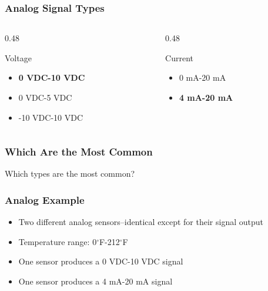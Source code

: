 \begin{frame}
    \frametitle{Analog Signal Types}

    \begin{columns}[t]
        \begin{column}{0.48\linewidth}
            \begin{block}{Voltage}
                \begin{itemize}
                    \item \textbf{0 VDC-10 VDC}
                    \item 0 VDC-5 VDC
                    \item -10 VDC-10 VDC
                \end{itemize}
            \end{block}
        \end{column}
        \begin{column}{0.48\linewidth}
            \begin{block}{Current}
                \begin{itemize}
                    \item 0 mA-20 mA
                    \item \textbf{4 mA-20 mA}
                \end{itemize}
            \end{block}
        \end{column}
    \end{columns}
\end{frame}

\begin{frame}
    \frametitle{Which Are the Most Common}

    \centering
    \Large{Which types are the most common?}
\end{frame}

\begin{frame}
    \frametitle{Analog Example}

    \begin{itemize}
        \item Two different analog sensors--identical except for their signal output
        \item Temperature range: 0$^\circ$F-212$^\circ$F
        \item One sensor produces a 0 VDC-10 VDC signal
        \item One sensor produces a 4 mA-20 mA signal
    \end{itemize}
\end{frame}

